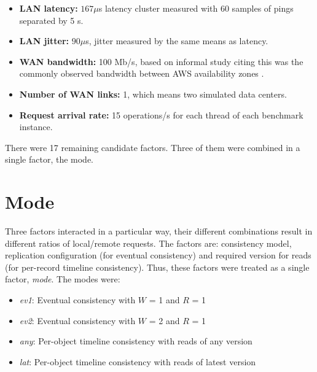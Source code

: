 \documentclass[doublespacing]{bmcart}
\begin{document}
\begin{itemize}
\item \textbf{LAN latency:} $167\mu$s latency cluster measured with 60 samples
of pings separated by 5 s.

\item \textbf{LAN jitter:} $90\mu$s, jitter measured by the same means as
latency.

\item \textbf{WAN bandwidth:} 100 Mb/s, based on informal study citing this was
the commonly observed bandwidth between AWS availability zones
\cite{Pujol2012}.

\item \textbf{Number of WAN links:} 1, which means two simulated data centers.

\item \textbf{Request arrival rate:} 15 operations/s for each thread of each
benchmark instance.

\end{itemize}

There were 17 remaining candidate factors. Three of them were combined in a
single factor, the mode.

\section{Mode}

Three factors interacted in a particular way, their different combinations
result in different ratios of local/remote requests. The factors are:
consistency model, replication configuration (for eventual consistency) and
required version for reads (for per-record timeline consistency). Thus, these
factors were treated as a single factor, \textit{mode}. The modes were:

\begin{itemize}

\item \textit{ev1}: Eventual consistency with $W$ = 1 and $R$ = 1

\item \textit{ev2}: Eventual consistency with $W$ = 2 and $R$ = 1

\item \textit{any}: Per-object timeline consistency with reads of any version

\item \textit{lat}: Per-object timeline consistency with reads of latest version

\end{itemize}
\end{document}
